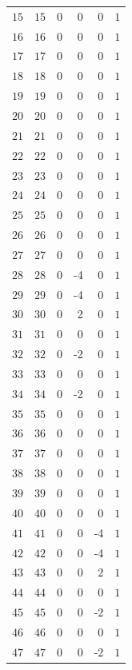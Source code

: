 {\begin{longtable}{@{}r r r r r c@{}}
\(15\) & \(15\) & 0 & 0 & 0 & \(1\) \\
\(16\) & \(16\) & 0 & 0 & 0 & \(1\) \\
\(17\) & \(17\) & 0 & 0 & 0 & \(1\) \\
\(18\) & \(18\) & 0 & 0 & 0 & \(1\) \\
\(19\) & \(19\) & 0 & 0 & 0 & \(1\) \\
\(20\) & \(20\) & 0 & 0 & 0 & \(1\) \\
\(21\) & \(21\) & 0 & 0 & 0 & \(1\) \\
\(22\) & \(22\) & 0 & 0 & 0 & \(1\) \\
\(23\) & \(23\) & 0 & 0 & 0 & \(1\) \\
\(24\) & \(24\) & 0 & 0 & 0 & \(1\) \\
\(25\) & \(25\) & 0 & 0 & 0 & \(1\) \\
\(26\) & \(26\) & 0 & 0 & 0 & \(1\) \\
\(27\) & \(27\) & 0 & 0 & 0 & \(1\) \\
\(28\) & \(28\) & 0 & -4 & 0 & \(1\) \\
\(29\) & \(29\) & 0 & -4 & 0 & \(1\) \\
\(30\) & \(30\) & 0 & 2 & 0 & \(1\) \\
\(31\) & \(31\) & 0 & 0 & 0 & \(1\) \\
\(32\) & \(32\) & 0 & -2 & 0 & \(1\) \\
\(33\) & \(33\) & 0 & 0 & 0 & \(1\) \\
\(34\) & \(34\) & 0 & -2 & 0 & \(1\) \\
\(35\) & \(35\) & 0 & 0 & 0 & \(1\) \\
\(36\) & \(36\) & 0 & 0 & 0 & \(1\) \\
\(37\) & \(37\) & 0 & 0 & 0 & \(1\) \\
\(38\) & \(38\) & 0 & 0 & 0 & \(1\) \\
\(39\) & \(39\) & 0 & 0 & 0 & \(1\) \\
\(40\) & \(40\) & 0 & 0 & 0 & \(1\) \\
\(41\) & \(41\) & 0 & 0 & -4 & \(1\) \\
\(42\) & \(42\) & 0 & 0 & -4 & \(1\) \\
\(43\) & \(43\) & 0 & 0 & 2 & \(1\) \\
\(44\) & \(44\) & 0 & 0 & 0 & \(1\) \\
\(45\) & \(45\) & 0 & 0 & -2 & \(1\) \\
\(46\) & \(46\) & 0 & 0 & 0 & \(1\) \\
\(47\) & \(47\) & 0 & 0 & -2 & \(1\) \\

\end{longtable}}
